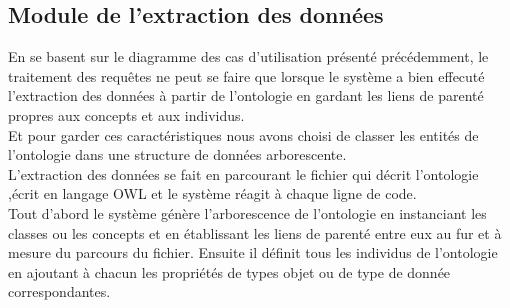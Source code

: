     \subsection{Module de l'extraction des données}
                En se basent sur le diagramme des cas d'utilisation présenté précédemment, le traitement des requêtes ne peut se faire que lorsque le système a bien effecuté l'extraction des données à partir de l'ontologie en gardant les liens de parenté propres aux concepts et aux individus.\\
                Et pour garder ces caractéristiques nous avons  choisi de classer les entités de l'ontologie dans une structure de données arborescente.\\
                L'extraction des données se fait en parcourant le fichier qui décrit l'ontologie ,écrit en langage OWL et le système réagit à chaque ligne de code.\\
                Tout d'abord le système génère l'arborescence de l'ontologie en instanciant les classes ou les concepts et en établissant les liens de parenté entre eux au fur et à mesure du parcours du fichier.
                Ensuite il définit tous les individus de l'ontologie en ajoutant à chacun les  propriétés de types objet ou de type de donnée correspondantes.

